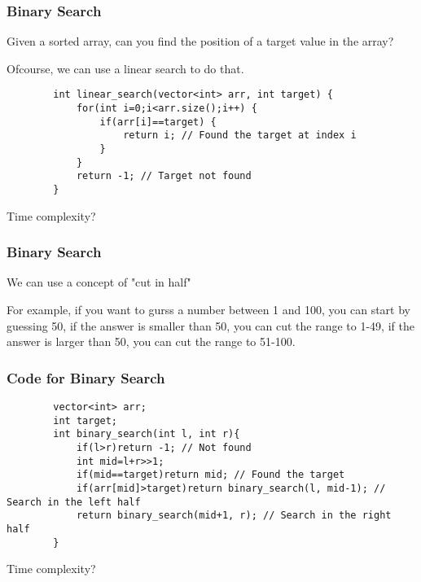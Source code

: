 \documentclass[xcolor=dvipsnames]{beamer}
\begin{document}
	\begin{frame}[fragile]
        \frametitle{Binary Search}
        Given a sorted array, can you find the position of a target value in the array?

        Ofcourse, we can use a linear search to do that.
        \begin{verbatim}
        int linear_search(vector<int> arr, int target) {
            for(int i=0;i<arr.size();i++) {
                if(arr[i]==target) {
                    return i; // Found the target at index i
                }
            }
            return -1; // Target not found
        }
        \end{verbatim}
        Time complexity?
	\end{frame}

	\begin{frame}[fragile]
        \frametitle{Binary Search}
        We can use a concept of "cut in half"

        For example, if you want to gurss a number between 1 and 100,
        you can start by guessing 50, if the answer is smaller than 50, you can cut the range to 1-49,
        if the answer is larger than 50, you can cut the range to 51-100.
	\end{frame}

	\begin{frame}[fragile]
        \frametitle{Code for Binary Search}

        \begin{verbatim}
        vector<int> arr;
        int target;
        int binary_search(int l, int r){
            if(l>r)return -1; // Not found
            int mid=l+r>>1;
            if(mid==target)return mid; // Found the target
            if(arr[mid]>target)return binary_search(l, mid-1); // Search in the left half
            return binary_search(mid+1, r); // Search in the right half
        }
        \end{verbatim}
        Time complexity?
	\end{frame}
\end{document}
